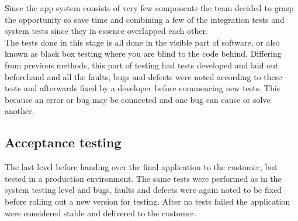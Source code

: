 Since the app system consists of very few components the team decided to grasp the opportunity so save time and combining a few of the integration tests and system tests since they in essence overlapped each other.\\

The tests done in this stage is all done in the visible part of software, or also known as black box testing where you are blind to the code behind. Differing from previous methods, this part of testing had tests developed and laid out beforehand and all the faults, bugs and defects were noted according to these tests and afterwards fixed by a developer before commencing new tests. This because an error or bug may be connected and one bug can cause or solve another.
\subsection{Acceptance testing}
The last level before handing over the final application to the customer, but tested in a production environment. The same tests were performed as in the system testing level and bugs, faults and defects were again noted to be fixed before rolling out a new version for testing. After no tests failed the application were considered stable and delivered to the customer.





